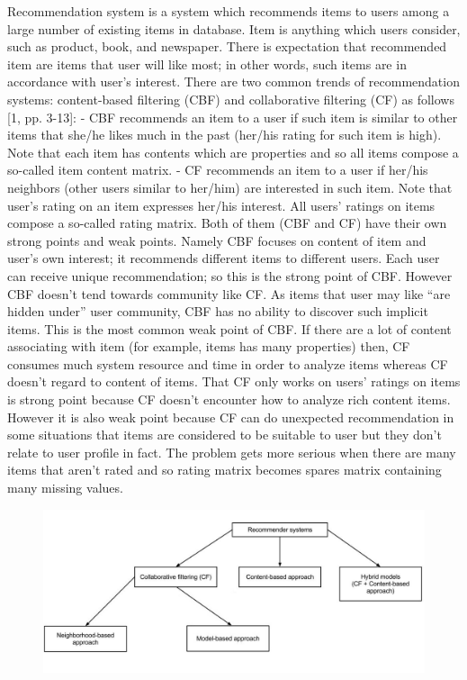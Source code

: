 Recommendation system is a system which recommends items to users among a large number of existing items 
in database. Item is anything which users consider, such as product, book, and newspaper. There is expectation 
that recommended item are items that  user will like most; in other words, such items are in accordance with 
user’s interest. 
There are two common trends of recommendation systems: content-based filtering (CBF) and collaborative 
filtering (CF) as follows [1, pp. 3-13]: 
- CBF recommends an item to a user if such item is similar to other items that she/he likes much in the 
past (her/his rating for such item is high). Note that each item has contents which are properties and so 
all items compose a so-called item content matrix. 
- CF recommends an item to a user if her/his neighbors (other users similar to her/him) are interested in 
such item.  Note  that  user’s  rating  on  an item  expresses  her/his  interest.  All users’  ratings  on  items 
compose a so-called rating matrix. 
Both of them (CBF and CF) have their own strong points and weak points. Namely CBF focuses on content of 
item and  user’s own interest;  it recommends  different  items  to different  users. Each  user  can  receive unique 
recommendation; so this is the strong point of CBF. However CBF doesn’t tend towards community like CF. As 
items that user may like “are hidden under” user community, CBF has no ability to discover such implicit items. 
This is the most common weak point of CBF. 
If  there are a  lot  of  content associating with  item  (for  example, items has  many  properties)  then, CF 
consumes much system resource and  time  in order to analyze items  whereas  CF  doesn’t regard to content  of 
items.  That  CF only works  on  users’  ratings  on  items  is  strong  point  because CF  doesn’t  encounter  how to 
analyze rich content items. However it is also weak point because CF can do unexpected recommendation in 
some situations that items are considered to be suitable to user but they don’t relate to user profile in fact. The 
problem gets more  serious when there are  many items  that aren’t  rated  and  so rating  matrix becomes spares 
matrix containing many missing values.

\begin{figure}[ht!]
	\centering
	\includegraphics[scale=0.5]{images/recommender_systems.jpg}
	\caption{}
	\label{fig:RS}
\end{figure}


